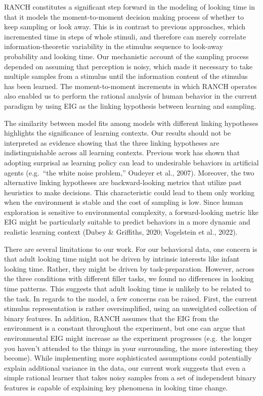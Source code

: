 \documentclass[10pt, letterpaper]{article}
\begin{document}
RANCH constitutes a significant step forward in the modeling of looking
time in that it models the moment-to-moment decision making process of
whether to keep sampling or look away. This is in contrast to previous
approaches, which incremented time in steps of whole stimuli, and
therefore can merely correlate information-theoretic variability in the
stimulus sequence to look-away probability and looking time. Our
mechanistic account of the sampling process depended on assuming that
perception is noisy, which made it necessary to take multiple samples
from a stimulus until the information content of the stimulus has been
learned. The moment-to-moment increments in which RANCH operates also
enabled us to perform the rational analysis of human behavior in the
current paradigm by using EIG as the linking hypothesis between learning
and sampling.

The similarity between model fits among models with different linking
hypotheses highlights the significance of learning contexts. Our results
should not be interpreted as evidence showing that the three linking
hypotheses are indistinguishable across all learning contexts. Previous
work has shown that adopting surprisal as learning policy can lead to
undesirable behaviors in artificial agents (e.g.~``the white noise
problem,'' Oudeyer et al., 2007). Moreover, the two alternative linking
hypotheses are backward-looking metrics that utilize past heuristics to
make decisions. This characteristic could lead to them only working when
the environment is stable and the cost of sampling is low. Since human
exploration is sensitive to environmental complexity, a forward-looking
metric like EIG might be particularly suitable to predict behaviors in a
more dynamic and realistic learning context (Dubey \& Griffiths, 2020;
Vogelstein et al., 2022).

There are several limitations to our work. For our behavioral data, one
concern is that adult looking time might not be driven by intrinsic
interests like infant looking time. Rather, they might be driven by
task-preparation. However, across the three conditions with different
filler tasks, we found no differences in looking time patterns. This
suggests that adult looking time is unlikely to be related to the task.
In regards to the model, a few concerns can be raised. First, the
current stimulus representation is rather oversimplified, using an
unweighted collection of binary features. In addition, RANCH assumes
that the EIG from the environment is a constant throughout the
experiment, but one can argue that environmental EIG might increase as
the experiment progresses (e.g.~the longer you haven't attended to the
things in your surrounding, the more interesting they become). While
implementing more sophisticated assumptions could potentially explain
additional variance in the data, our current work suggests that even a
simple rational learner that takes noisy samples from a set of
independent binary features is capable of explaining key phenomena in
looking time change.
\end{document}
